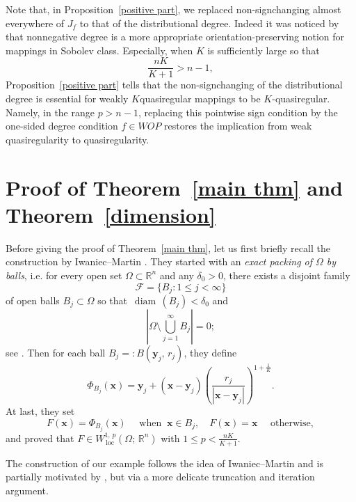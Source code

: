 \documentclass[reqno,11pt]{amsart}
\def\loc{{\mathop\mathrm{\,loc\,}}}
\def\diam{{\mathop\mathrm{\,diam\,}}}
\numberwithin{equation}{section}
\theoremstyle{remark}
\begin{document}
Note that, in Proposition~\ref{positive part}, we replaced non-signchanging  almost everywhere of $J_f$ to that of the distributional degree. Indeed it was noticed by \cite{BHM2017} that nonnegative degree is a more appropriate orientation-preserving notion for mappings in Sobolev class. 
Especially, when $K$ is sufficiently large so that
$$\frac{nK}{K+1}>n-1,$$
Proposition~\ref{positive part} tells that the non-signchanging of the distributional degree is essential for weakly $K$quasiregular mappings to be $K$-quasiregular.  
Namely, in the range $p>n-1$, replacing this pointwise sign condition
by the one-sided degree condition $f\in WOP$ restores the implication
from weak quasiregularity to quasiregularity.



\section{Proof of Theorem~\ref{main thm} and Theorem~\ref{dimension}}

Before giving the proof of Theorem~\ref{main thm}, let us first briefly recall the construction by Iwaniec--Martin \cite[Proof of Theorem 12.1]{IM1993}. They started with an \emph{exact packing of $\Omega$ by balls}, i.e. for every open set $\Omega\subset \mathbb R^n$ and any $\delta_0>0$, there exists a disjoint family 
$$\mathcal F=\{B_j\colon 1\le j<\infty\}$$
of open balls $B_j\subset \Omega$ so that $\diam (B_j)<\delta_0$ and 
$$\left|\Omega\setminus \bigcup_{j=1}^\infty B_j\right|=0;$$
see \cite[Section 1.5.1, Corollary 2]{EG1992}. Then for each ball $B_j=:B({\mathbf y}_j,\,r_j)$, they define 
$$\Phi_{B_j}(\mathbf x)={\mathbf y}_j+ (\mathbf x-{\mathbf y}_j)\left(\frac{r_j}{|\mathbf x-{\mathbf y}_j|}\right)^{1+\frac 1 K}.$$
At last, they set
$$F(\mathbf {x})=\Phi_{B_j}(\mathbf {x}) \quad  \text{ when } \ \mathbf {x}\in B_j, \quad F(\mathbf {x})=\mathbf {x} \quad \text{ otherwise},$$
and proved that $F\in  W^{1,\,p}_{\loc}(\Omega;\,\mathbb R^n)$ with $1\le p<\frac{nK}{K+1}.$

\medskip

The construction of our example follows the idea of Iwaniec--Martin and is partially motivated by \cite[Section 4]{KKM2001}, but via a more delicate truncation and iteration argument. 
\end{document}
